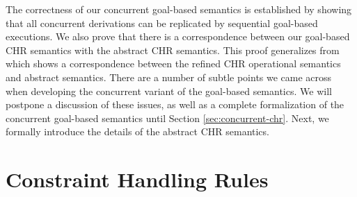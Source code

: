 \documentclass{tlp}
\begin{document}
The correctness of our concurrent goal-based semantics is established by showing that
all concurrent derivations can be replicated by sequential goal-based executions. We
also prove that there is a correspondence between our goal-based CHR 
semantics with the abstract CHR semantics. This proof generalizes from \cite{greg:thesis}
which shows a correspondence between the refined CHR operational semantics and abstract
semantics. There are a number of subtle points we came across when developing the concurrent 
variant of the goal-based semantics. We will postpone a discussion of these issues, as well 
as a complete formalization of the concurrent goal-based semantics until Section
\ref{sec:concurrent-chr}. Next, we formally introduce the details of the abstract CHR semantics.




\section{Constraint Handling Rules} \label{sec:chr-example} \label{ssec:chr-sem}
\end{document}

